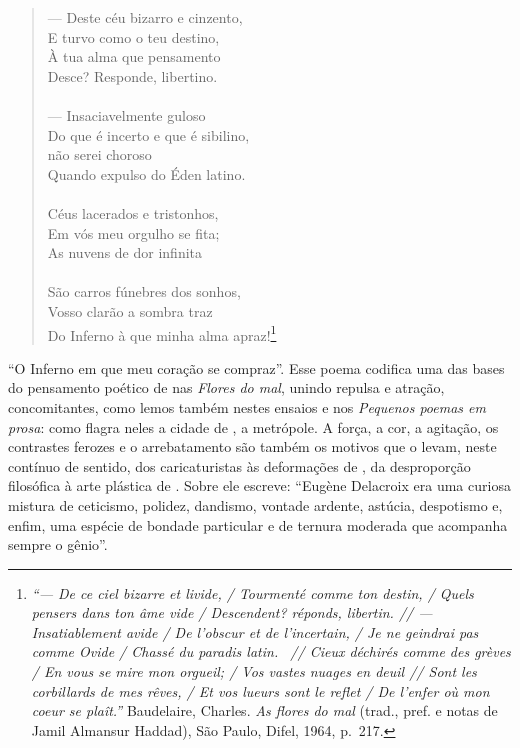 \begin{verse}
--- Deste céu bizarro e cinzento,\\
E turvo como o teu destino, \\
À tua alma que pensamento \\ 
Desce? Responde, libertino. \\ 
\ \\ 
--- Insaciavelmente guloso \\
Do que é incerto e que é sibilino, \\ 
 não serei choroso \\ 
Quando expulso do Éden latino. \\ 
 \ \\
Céus lacerados e tristonhos, \\  
Em vós meu orgulho se fita; \\
As nuvens de dor infinita\\ 
 \ \\
São carros fúnebres dos sonhos, \\ 
Vosso clarão a sombra traz \\ 
Do Inferno à que minha alma apraz!\footnote{ \textit{``--- De ce ciel bizarre et livide, / 
Tourmenté comme ton destin, /
Quels pensers dans ton âme vide / 
Descendent? réponds, libertin. //
--- Insatiablement avide /
De l'obscur et de l'incertain, /
Je ne geindrai pas comme Ovide /
Chassé du paradis latin.  //
Cieux déchirés comme des grèves /
En vous se mire mon orgueil; /
Vos vastes nuages en deuil //
Sont les corbillards de mes rêves, / 
Et vos lueurs sont le reflet /
De l'enfer où mon coeur se plaît.''}
Baudelaire, Charles. \textit{As flores do mal} (trad.,
pref. e notas de Jamil Almansur Haddad), São Paulo, Difel, 1964, p.~217.} 
\end{verse}

“O Inferno em que meu coração se compraz”. Esse poema codifica uma das
bases do pensamento poético de  nas \textit{Flores do mal},
unindo repulsa e atração, concomitantes, como lemos também nestes
ensaios e nos \textit{Pequenos poemas em prosa}: como flagra neles a
cidade de , a metrópole. A força, a cor, a agitação, os contrastes
ferozes e o arrebatamento são também os motivos que o levam, neste
contínuo de sentido, dos caricaturistas às deformações de , da
desproporção filosófica à arte plástica de . Sobre ele
 escreve: “Eugène Delacroix era uma curiosa mistura de
ceticismo, polidez, dandismo, vontade ardente, astúcia, despotismo e,
enfim, uma espécie de bondade particular e de ternura moderada que
acompanha sempre o gênio”.

